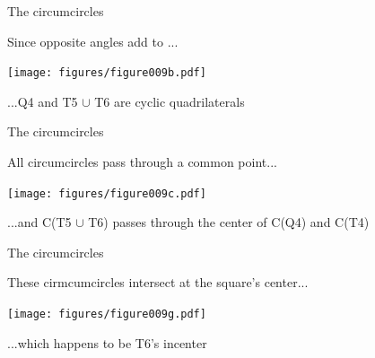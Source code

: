 \documentclass[14pt]{beamer}
\begin{document}

    \begin{frame}{The circumcircles}
        \begin{center}
            Since opposite angles add to \textpi...
        \end{center}
        \vspace{0.4em}
        \hspace{5.25em} \texttt{[image: figures/figure009b.pdf]} \\
        \begin{center}
            ...Q4 and T5 $\cup$ T6 are cyclic quadrilaterals
        \end{center}
    \end{frame}


    \begin{frame}{The circumcircles}
        \begin{center}
            All circumcircles pass through a common point...
        \end{center}
        \hspace{3.92em} \texttt{[image: figures/figure009c.pdf]} \\
        \begin{center}
            \footnotesize ...and C(T5 $\cup$ T6) passes through the center of C(Q4) and C(T4)
        \end{center}
    \end{frame}


    \begin{frame}{The circumcircles}
        \begin{center}
            These cirmcumcircles intersect at the square's center...
        \end{center}
        \vspace{0.90em}
        \hspace{5.25em} \texttt{[image: figures/figure009g.pdf]} \\
        \begin{center}
            ...which happens to be T6's incenter
        \end{center}
    \end{frame}

\end{document}
